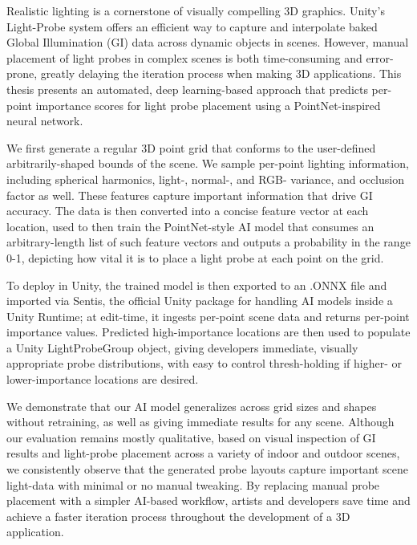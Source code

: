 Realistic lighting is a cornerstone of visually compelling 3D graphics. Unity's Light-Probe system offers an efficient way to capture and interpolate baked Global Illumination (GI) data across dynamic objects in scenes. However, manual placement of light probes in complex scenes is both time-consuming and error-prone, greatly delaying the iteration process when making 3D applications. This thesis presents an automated, deep learning-based approach that predicts per-point importance scores for light probe placement using a PointNet-inspired neural network.

We first generate a regular 3D point grid that conforms to the user-defined arbitrarily-shaped bounds of the scene. We sample per-point lighting information, including spherical harmonics, light-, normal-, and RGB- variance, and occlusion factor as well. These features capture important information that drive GI accuracy. The data is then converted into a concise feature vector at each location, used to then train the PointNet-style AI model that consumes an arbitrary-length list of such feature vectors and outputs a probability in the range 0-1, depicting how vital it is to place a light probe at each point on the grid.

To deploy in Unity, the trained model is then exported to an .ONNX file and imported via Sentis, the official Unity package for handling AI models inside a Unity Runtime; at edit-time, it ingests per-point scene data and returns per-point importance values. Predicted high-importance locations are then used to populate a Unity LightProbeGroup object, giving developers immediate, visually appropriate probe distributions, with easy to control thresh-holding if higher- or lower-importance locations are desired.

We demonstrate that our AI model generalizes across grid sizes and shapes without retraining, as well as giving immediate results for any scene. Although our evaluation remains mostly qualitative, based on visual inspection of GI results and light-probe placement across a variety of indoor and outdoor scenes, we consistently observe that the generated probe layouts capture important scene light-data with minimal or no manual tweaking. By replacing manual probe placement with a simpler AI-based workflow, artists and developers save time and achieve a faster iteration process throughout the development of a 3D application.
